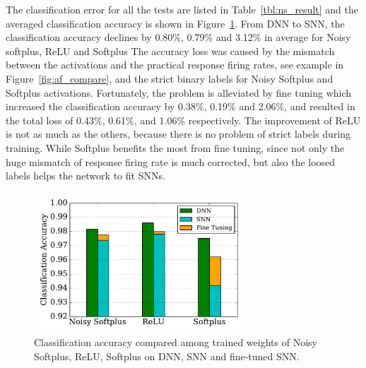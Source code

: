 	The classification error for all the tests are listed in Table~\ref{tbl:ns_result} and the averaged classification accuracy is shown in Figure~\ref{Fig:result_bar}.
	From DNN to SNN, the classification accuracy declines by 0.80\%, 0.79\% and 3.12\% in average for Noisy softplus, ReLU and Softplus
	The accuracy loss was caused by the mismatch between the activations and the practical response firing rates, see example in Figure~\ref{fig:af_compare}, and the strict binary labels for Noisy Softplus and Softplus activations.
	Fortunately, the problem is alleviated by fine tuning which increased the classification accuracy by 0.38\%, 0.19\% and 2.06\%, and resulted in the total loss of 0.43\%, 0.61\%, and 1.06\% respectively.
	The improvement of ReLU is not as much as the others, because there is no problem of strict labels during training.
	While Softplus benefits the most from fine tuning, since not only the huge mismatch of response firing rate is much corrected, but also the loosed labels helps the network to fit SNNs. 
	
	\begin{figure}[hbt!]
		\centering
		\includegraphics[width=0.7\textwidth]{pics_iconip/9-2.pdf}
		\caption{Classification accuracy compared among trained weights of Noisy Softplus, ReLU, Softplus on DNN, SNN and fine-tuned SNN.}
		\label{Fig:result_bar}
	\end{figure}
	
